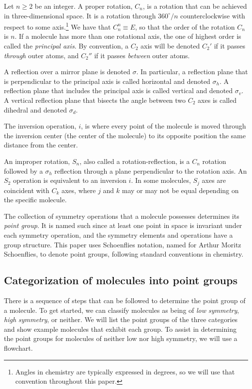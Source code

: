 \documentclass{article}
\begin{document}
    Let $n\geq2$ be an integer. A proper rotation, $C_n$, is a rotation that can be achieved in three-dimensional space. It is a rotation through $360^\circ/n$ counterclockwise with respect to some axis.\footnote{Angles in chemistry are typically expressed in degrees, so we will use that convention throughout this paper.} We have that $C_n^n\equiv E$, so that the order of the rotation $C_n$ is $n$. If a molecule has more than one rotational axis, the one of highest order is called the \emph{principal axis}. By convention, a $C_2$ axis will be denoted $C_2'$ if it passes \emph{through} outer atoms, and $C_2''$ if it passes \emph{between} outer atoms.

    A reflection over a mirror plane is denoted $\sigma$. In particular, a reflection plane that is perpendicular to the principal axis is called horizontal and denoted $\sigma_h$. A reflection plane that includes the principal axis is called vertical and denoted $\sigma_v$. A vertical reflection plane that bisects the angle between two $C_2$ axes is called dihedral and denoted $\sigma_d$.

    The inversion operation, $i$, is where every point of the molecule is moved through the inversion center (the center of the molecule) to its opposite position the same distance from the center.

    An improper rotation, $S_n$, also called a rotation-reflection, is a $C_n$ rotation followed by a $\sigma_h$ reflection through a plane perpendicular to the rotation axis. An $S_2$ operation is equivalent to an inversion $i$. In some molecules, $S_j$ axes are coincident with $C_k$ axes, where $j$ and $k$ may or may not be equal depending on the specific molecule.

    The collection of symmetry operations that a molecule possesses determines its \emph{point group}. It is named such since at least one point in space is invariant under each symmetry operation, and the symmetry elements and operations have a group structure. This paper uses Schoenflies notation, named for Arthur Moritz Schoenflies, to denote point groups, following standard conventions in chemistry. \cite{mcgrady2024}

    \subsection{Categorization of molecules into point groups}

    There is a sequence of steps that can be followed to determine the point group of a molecule. To get started, we can classify molecules as being of \emph{low symmetry}, \emph{high symmetry}, or neither. We will list the point groups of the three categories and show example molecules that exhibit each group. To assist in determining the point groups for molecules of neither low nor high symmetry, we will use a flowchart.
\end{document}
